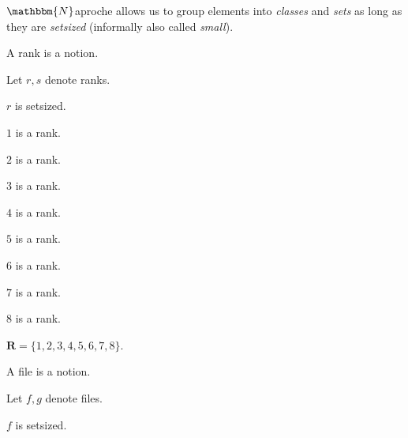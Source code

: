 \documentclass{article}
\newcommand{\Rank}{\mathbf{R}} %
\newcommand{\Naproche}{$\mathbbm{N}$aproche}
\begin{document}
\Naproche{} allows us to group elements into \textit{classes} and \textit{sets} as long as they are \textit{setsized} (informally also called \textit{small}).
\begin{forthel}
    \begin{signature} A rank is a notion. \end{signature}
    Let $r, s$ denote ranks.

    \begin{axiom} $r$ is setsized. \end{axiom}

    \begin{signature} $1$ is a rank. \end{signature}
    \begin{signature} $2$ is a rank. \end{signature}
    \begin{signature} $3$ is a rank. \end{signature}
    \begin{signature} $4$ is a rank. \end{signature}
    \begin{signature} $5$ is a rank. \end{signature}
    \begin{signature} $6$ is a rank. \end{signature}
    \begin{signature} $7$ is a rank. \end{signature}
    \begin{signature} $8$ is a rank. \end{signature}

    \begin{definition} $\Rank = \{1,2,3,4,5,6,7,8\}$. \end{definition}

    \begin{signature} A file is a notion. \end{signature}
    Let $f, g$ denote files.

    \begin{axiom} $f$ is setsized. \end{axiom}


\end{forthel}
\end{document}
